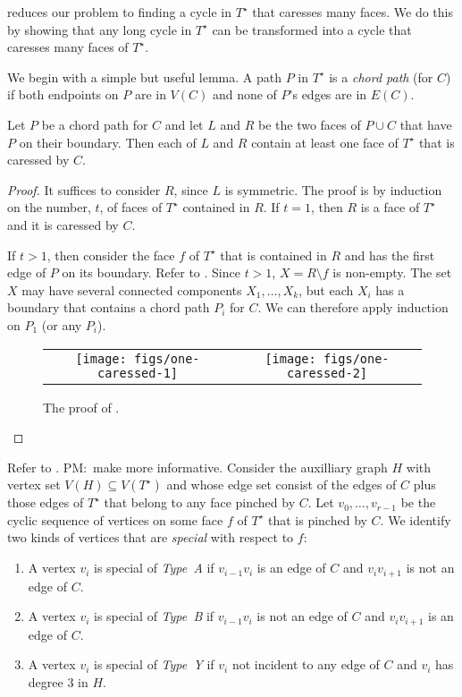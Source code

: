 \documentclass{patmorin}
\newcommand{\dual}[1]{{#1}^\star}
\newcommand{\note}[2]{{\color{red}#1:~#2}}
\begin{document}
 reduces our problem to finding a cycle in
$\dual{T}$ that caresses many faces.  We do this by showing that any
long cycle in $\dual{T}$ can be transformed into a cycle that caresses
many faces of $\dual{T}$.  

We begin with a simple but useful lemma.  A path $P$ in $\dual{T}$ is
a \emph{chord path} (for $C$) if both endpoints on $P$ are in $V(C)$
and none of $P$'s edges are in $E(C)$.

\begin{lem}
   Let $P$ be a chord path for $C$ and let $L$ and $R$ be the two faces
   of $P\cup C$ that have $P$ on their boundary. Then each of $L$ and $R$
   contain at least one face of $\dual{T}$ that is caressed by $C$.
\end{lem}

\begin{proof}
   It suffices to consider $R$, since $L$ is symmetric.  The proof is by
   induction on the number, $t$, of faces of $\dual{T}$ contained in $R$.
   If $t=1$, then $R$ is a face of $\dual{T}$ and it is caressed by $C$.

   If $t>1$, then consider the face $f$ of $\dual{T}$ that is contained
	in $R$ and has the first edge of $P$ on its boundary.  Refer to . Since $t>1$,
   $X=R\setminus f$ is non-empty. The set $X$ may have several connected
   components $X_1,\ldots,X_k$, but each $X_i$ has a boundary that contains a chord path $P_i$ for $C$.
	We can therefore apply induction on $P_1$ (or any $P_i$).
  \begin{figure}
     \begin{center}
	\begin{tabular}{cc}
		\texttt{[image: figs/one-caressed-1]} &
		\texttt{[image: figs/one-caressed-2]}
	\end{tabular}
     \end{center}
	  \caption{The proof of .}
  \end{figure}
\end{proof}

Refer to . \note{PM}{make \figref{auxilliary} more informative.}
Consider the auxilliary
graph $H$ with vertex set $V(H)\subseteq V(\dual{T})$ and whose edge set
consist of the edges of $C$ plus those edges of $\dual{T}$ that belong
to any face pinched by $C$. Let $v_0,\ldots,v_{r-1}$ be the cyclic sequence of vertices on some face $f$ of $\dual{T}$ that is pinched by $C$.  
We identify two kinds of vertices that are \emph{special} with respect to $f$:
\begin{enumerate}
  \item A vertex $v_i$ is special of \emph{Type~A} if $v_{i-1}v_i$ is an edge of $C$ and $v_iv_{i+1}$ is not an edge of $C$.
  \item A vertex $v_i$ is special of \emph{Type~B} if $v_{i-1}v_i$ is not an edge of $C$ and $v_iv_{i+1}$ is an edge of $C$.
  \item A vertex $v_i$ is special of \emph{Type~Y} if $v_i$ not incident to any edge of $C$ and $v_i$ has degree 3 in $H$.
\end{enumerate}
\end{document}
